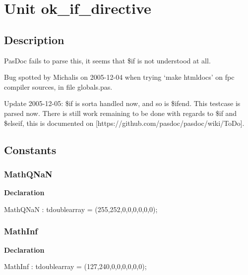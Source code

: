 \documentclass{report}
\begin{document}
\newlength{\tmplength}
\chapter{Unit ok{\_}if{\_}directive}
\section{Description}
PasDoc fails to parse this, it seems that {\$}if is not understood at all.\hfill\vspace*{1ex}



Bug spotted by Michalis on 2005{-}12{-}04 when trying `make htmldocs' on fpc compiler sources, in file globals.pas.

Update 2005{-}12{-}05: {\$}if is sorta handled now, and so is {\$}ifend. This testcase is parsed now. There is still work remaining to be done with regards to {\$}if and {\$}elseif, this is documented on [https://github.com/pasdoc/pasdoc/wiki/ToDo].
\section{Constants}
\subsection*{MathQNaN}
\begin{list}{}{
\setlength{\itemindent}{0cm}
\setlength{\listparindent}{0cm}
\setlength{\leftmargin}{\evensidemargin}
\addtolength{\leftmargin}{\tmplength}
\settowidth{\labelsep}{X}
\addtolength{\leftmargin}{\labelsep}
\setlength{\labelwidth}{\tmplength}
}
\begin{flushleft}
\item[\textbf{Declaration}\hfill]
\begin{ttfamily}
MathQNaN : tdoublearray = (255,252,0,0,0,0,0,0);\end{ttfamily}


\end{flushleft}
\end{list}
\subsection*{MathInf}
\begin{list}{}{
\setlength{\itemindent}{0cm}
\setlength{\listparindent}{0cm}
\setlength{\leftmargin}{\evensidemargin}
\addtolength{\leftmargin}{\tmplength}
\settowidth{\labelsep}{X}
\addtolength{\leftmargin}{\labelsep}
\setlength{\labelwidth}{\tmplength}
}
\begin{flushleft}
\item[\textbf{Declaration}\hfill]
\begin{ttfamily}
MathInf : tdoublearray = (127,240,0,0,0,0,0,0);\end{ttfamily}


\end{flushleft}
\end{list}
\end{document}
